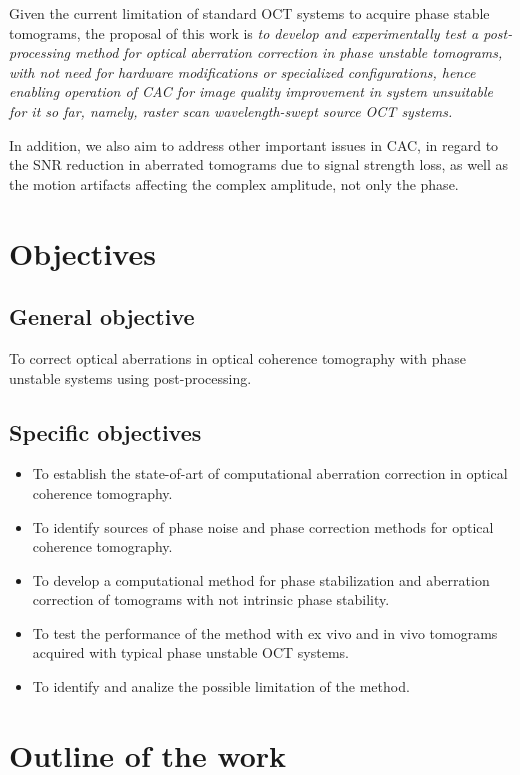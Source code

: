 Given the current limitation of standard OCT systems to acquire phase stable tomograms, the proposal of this work is \textit{to develop and experimentally test a post-processing method for optical aberration correction in phase unstable tomograms, with not need for hardware modifications or specialized configurations, hence enabling operation of CAC for image quality improvement in system unsuitable for it so far, namely, raster scan wavelength-swept source OCT systems.}

In addition, we also aim to address other important issues in CAC, in regard to the SNR reduction in aberrated tomograms due to signal strength loss, as well as the motion artifacts affecting the complex amplitude, not only the phase.

\section{Objectives}

\subsection{General objective}

To correct optical aberrations in optical coherence tomography with phase unstable systems using post-processing.

\subsection{Specific objectives}

\begin{itemize}
    \item To establish the state-of-art of computational aberration correction in optical coherence tomography.
    \item To identify sources of phase noise and phase correction methods for optical coherence tomography.
    \item To develop a computational method for phase stabilization and aberration correction of tomograms with not intrinsic phase stability.
    \item To test the performance of the method with ex vivo and in vivo tomograms acquired with typical phase unstable OCT systems.
    \item To identify and analize the possible limitation of the method.
\end{itemize}

\section{Outline of the work}

